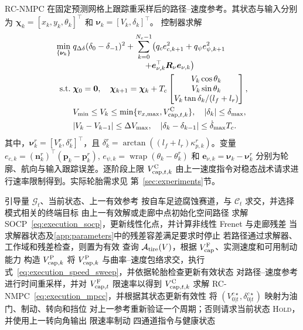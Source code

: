 \documentclass[final,5p,twocolumn]{elsarticle}
\begin{document}
RC-NMPC 在固定预测网格上跟踪重采样后的路径--速度参考。其状态与输入分别为
$\bm\chi_k=[x_k,y_k,\theta_k]^\top$ 和 $\bm\nu_k=[V_k,\delta_k]^\top$。
控制器求解
\begin{equation}
\begin{aligned}
\min_{\{\bm\nu_k\}}\;&q_{\Delta\delta}(\delta_0-\delta_{-1})^2+
\sum_{k=0}^{N_c-1}\!\left(q_ce_{c,k+1}^2+q_\psi e_{\psi,k+1}^2\right.\\[-1mm]
&\left.\hspace{30mm}+\bm e_{\nu,k}^\top\bm R_\nu\bm e_{\nu,k}\right)\\
\mathrm{s.t.}\;&\bm\chi_0=\bm0,\quad
\bm\chi_{k+1}=\bm\chi_k+T_c
\begin{bmatrix}
V_k\cos\theta_k\\ V_k\sin\theta_k\\
V_k\tan\delta_k/(l_f+l_r)
\end{bmatrix},\\
&V_{\min}\le V_k\le
\min\{v_{x,\max},V_{{\rm cap},t,k}^{\rm C}\},\quad
|\delta_k|\le\delta_{\max},\\
&|V_k-V_{k-1}|\le\Delta V_{\max},\quad
|\delta_k-\delta_{k-1}|\le\dot\delta_{\max}T_c .
\end{aligned}
\label{eq:execution_mpcc}
\end{equation}
其中，$\bm\nu_k^r=[V_k^r,\delta_k^r]^\top$，且
$\delta_k^r=\arctan((l_f+l_r)\kappa_{p,k}^r)$。变量
$e_{c,k}=(\bm n_k^r)^\top(\bm p_k-\bm p_k^r)$,
$e_{\psi,k}=\operatorname{wrap}(\theta_k-\theta_k^r)$ 和
$\bm e_{\nu,k}=\bm\nu_k-\bm\nu_k^r$ 分别为轮廓、航向与输入跟踪误差。逐阶段上限
$V_{{\rm cap},t,k}^{\rm C}$ 由上一速度指令对稳态战术请求进行速率限制得到。实际轮胎需求见
第~\ref{sec:experiments}节。

\begin{algorithm}[!tbp]
\caption{通用参考生成器与执行器}
\label{alg:executor}
\footnotesize
\begin{algorithmic}[1]
\REQUIRE 引导量 \(\mathcal G_t\)、当前状态、上一有效参考
\STATE 按自车足迹腐蚀赛道，与 $\mathcal C_t$ 求交，并选择模式相关的终端目标
\STATE 由上一有效解或走廊中点初始化空间路径
\STATE 求解 SOCP~\eqref{eq:execution_socp}，更新线性化点，并计算非线性 Frenet 与走廊残差
\STATE 当求解器状态及\ref{app:parameters}中的残差容差满足要求时停止
\ENDFOR
\STATE 若路径通过求解器、工作域和残差检查，则置为有效
\STATE 查询 $\mathcal A_{\rm tire}(V)$，根据 $V_{\rm cap}^{\rm F}$、实测速度和可用制动能力
构造 $V_{{\rm cap},k}^{\rm P}$
\STATE 将 $V_{{\rm cap},k}^{\rm P}$ 与曲率--速度包络求交，执行
式~\eqref{eq:execution_speed_sweep}，并依据轮胎检查更新有效状态
\ENDIF
{}
\STATE 对路径--速度参考进行时间重采样，并对 $V_{{\rm cap},t}^{\rm F}$ 限速率以得到
$V_{{\rm cap},t,k}^{\rm C}$
\STATE 求解 RC-NMPC~\eqref{eq:execution_mpcc}，并根据其状态更新有效性
\ENDIF
{}
\STATE 将 $(V_{0|t}^{c\star},\delta_{0|t}^{c\star})$ 映射为油门、制动、转向和挡位
\ELSE
\STATE 对上一参考重新验证一个周期；否则请求当前状态 \textsc{Hold}，并使用上一转向角输出
限速率制动
\ENDIF
\RETURN 四通道指令与健康状态
\end{algorithmic}
\end{algorithm}
\FloatBarrier
\endgroup
\end{document}
